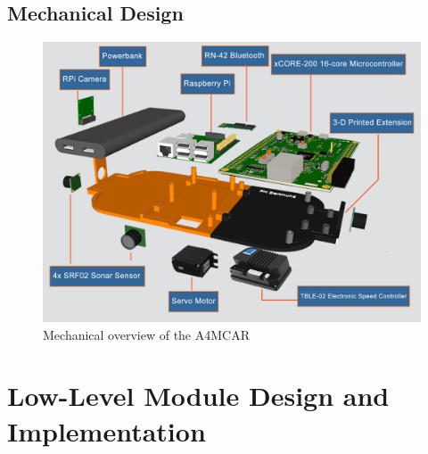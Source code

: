 \subsection{Mechanical Design}
\begin{figure}[htb]
	\includegraphics[scale=0.25]{content/images/mechanicaloverview.png}
	\caption{Mechanical overview of the A4MCAR}
	\label{fig:sysmlxmostasks}
\end{figure}
\section{Low-Level Module Design and Implementation}
